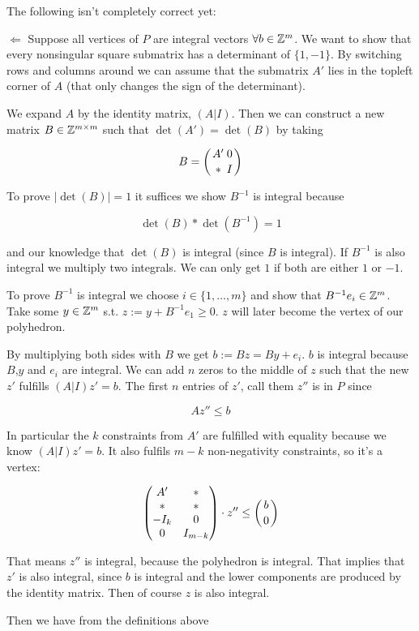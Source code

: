 \begin{pr}
\begin{pr}
The following isn't completely correct yet:

$\Leftarrow$ Suppose all vertices of $P$ are integral vectors $\forall b\in \mathbb{Z}^m$. We want to show that every nonsingular square submatrix has a determinant of $\{1,-1\}$. By switching rows and columns around we can assume that the submatrix $A'$ lies in the topleft corner of $A$ (that only changes the sign of the determinant). 

We expand $A$ by the identity matrix, $(A|I)$. Then we can construct a new matrix $B\in \mathbb{Z}^{m\times m}$ such that $\det (A') = \det (B)$ by taking 

\[B = \left({A' \atop *} {0\atop I}\right)\]

To prove $|\det (B)| =1$ it suffices we show $B^{-1}$ is integral because

\[\det(B)*\det(B^{-1}) = 1\]

and our knowledge that $\det (B)$ is integral (since $B$ is integral). If $B^{-1}$ is also integral we multiply two integrals. We can only get $1$ if both are either $1$ or $-1$.

To prove $B^{-1}$ is integral we choose $i\in \{1,\ldots, m\}$ and show that $B^{-1}e_i\in \mathbb{Z}^m$. Take some $y\in \mathbb{Z}^m$ s.t. $z:= y + B^{-1}e_1\geq 0$. $z$ will later become the vertex of our polyhedron. 

By multiplying both sides with $B$ we get $b:= Bz=By+e_i$. $b$ is integral because $B$,$y$ and $e_i$ are integral. We can add $n$ zeros to the middle of $z$ such that the new $z'$ fulfills $(A|I)z'=b$. The first $n$ entries of $z'$, call them $z''$ is in $P$ since

\[Az''\leq b\]

In particular the $k$ constraints from $A'$ are fulfilled with equality because we know $(A|I)z'=b$. It also fulfils $m-k$ non-negativity constraints, so it's a vertex:

\[\begin{pmatrix}
A' & *\\
* & *\\
-I_k & 0 \\
0 & I_{m-k}
\end{pmatrix} \cdot z'' \leq \left(b \atop 0\right)\]

That means $z''$ is integral, because the polyhedron is integral. That implies that $z'$ is also integral, since $b$ is integral and the lower components are produced by the identity matrix. Then of course $z$ is also integral.

Then we have from the definitions above


\end{pr}
\end{pr}
